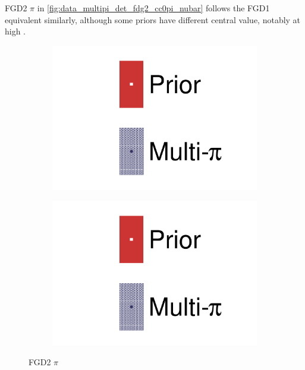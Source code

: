 FGD2 $\pi$ in \autoref{fig:data_multipi_det_fdg2_cc0pi_nubar} follows the FGD1 equivalent similarly, although some priors have different central value, notably at high \pmu.
\begin{figure}[h]
	\centering
	\begin{subfigure}[t]{0.32\textwidth}
		\includegraphics[width=\textwidth,page=48, trim={0mm 0mm 0mm 0mm}, clip]{figures/mach3/2018/data/2018a_FixedCov_RedCov_Mpi_Data_merge_drawPar_withDet}
	\end{subfigure}
	\begin{subfigure}[t]{0.32\textwidth}
		\includegraphics[width=\textwidth,page=49, trim={0mm 0mm 0mm 0mm}, clip]{figures/mach3/2018/data/2018a_FixedCov_RedCov_Mpi_Data_merge_drawPar_withDet}
	\end{subfigure}
	\caption{FGD2 $\pi$}
	\label{fig:data_multipi_det_fdg2_cc0pi_nubar}
\end{figure}

